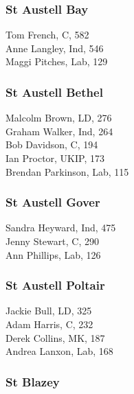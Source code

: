 \documentclass[a4paper,openany,10pt]{book}
\begin{document}
\subsubsection*{St Austell Bay}



Tom French, C, 582\\
Anne Langley, Ind, 546\\
Maggi Pitches, Lab, 129\\


\subsubsection*{St Austell Bethel}



Malcolm Brown, LD, 276\\
Graham Walker, Ind, 264\\
Bob Davidson, C, 194\\
Ian Proctor, UKIP, 173\\
Brendan Parkinson, Lab, 115\\


\subsubsection*{St Austell Gover}



Sandra Heyward, Ind, 475\\
Jenny Stewart, C, 290\\
Ann Phillips, Lab, 126\\


\subsubsection*{St Austell Poltair}



Jackie Bull, LD, 325\\
Adam Harris, C, 232\\
Derek Collins, MK, 187\\
Andrea Lanxon, Lab, 168\\


\subsubsection*{St Blazey}
\end{document}
